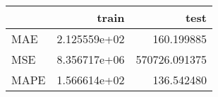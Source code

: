 \begin{tabular}{lrr}
\toprule
{} &         train &           test \\
\midrule
MAE  &  2.125559e+02 &     160.199885 \\
MSE  &  8.356717e+06 &  570726.091375 \\
MAPE &  1.566614e+02 &     136.542480 \\
\bottomrule
\end{tabular}
